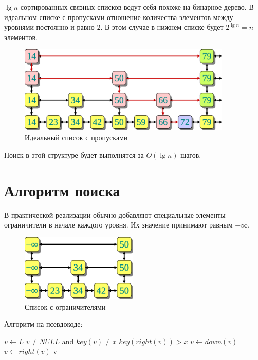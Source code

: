 \documentclass[11pt]{article}
\begin{document}
$\lg n$ сортированных связных списков ведут себя похоже на бинарное дерево. В идеальном списке с пропусками отношение количества элементов между уровнями постоянно и равно $2$. В этом случае в нижнем списке будет $2^{\lg n} = n$ элементов.
\begin{figure}[ht]
  \centering
  \includegraphics[width=4in]{lecture12/skiplist.eps}
  \caption{Идеальный список с пропусками}
  \label{fig:skiplist}
\end{figure}
Поиск в этой структуре будет выполнятся за $O(\lg n)$ шагов.

\section{Алгоритм поиска}
В практической реализации обычно добавляют специальные элементы-ограничители в начале каждого уровня. Их значение принимают равным $-\infty$.
\begin{figure}[ht]
  \centering
  \includegraphics[width=2.2in]{lecture12/skiplist_inf.eps}
  \caption{Список с ограничителями}
  \label{fig:skiplist_inf}
\end{figure}

Алгоритм на псевдокоде:
\begin{codebox}
\li $v \gets L$
\li \While $v \neq NULL$ and $key(v) \neq x$ 
\li \Do
\li \If $key(right(v)) > x$
\li   \Then $v \gets down(v)$
\li   \Else $v \gets right(v)$ 
    \End
  \End
\li \Return v
\end{codebox}
\end{document}
